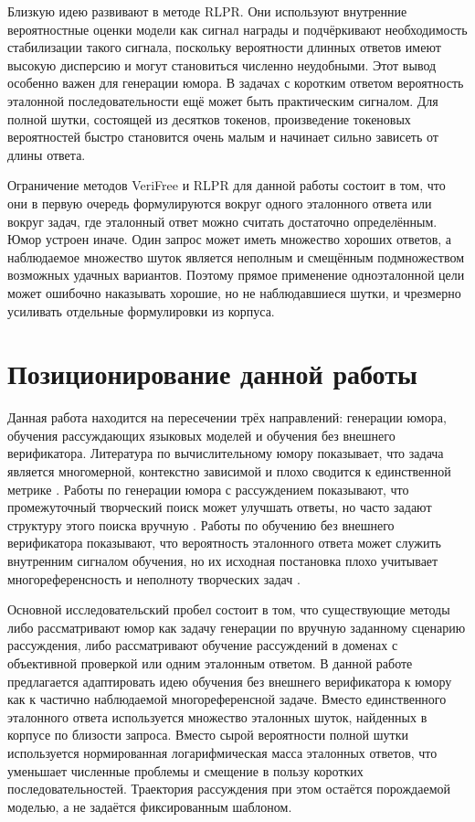 Близкую идею развивают \citet{Yu2025} в методе RLPR. Они используют внутренние вероятностные оценки модели как сигнал награды и подчёркивают необходимость стабилизации такого сигнала, поскольку вероятности длинных ответов имеют высокую дисперсию и могут становиться численно неудобными. Этот вывод особенно важен для генерации юмора. В задачах с коротким ответом вероятность эталонной последовательности ещё может быть практическим сигналом. Для полной шутки, состоящей из десятков токенов, произведение токеновых вероятностей быстро становится очень малым и начинает сильно зависеть от длины ответа.

Ограничение методов VeriFree и RLPR для данной работы состоит в том, что они в первую очередь формулируются вокруг одного эталонного ответа или вокруг задач, где эталонный ответ можно считать достаточно определённым. Юмор устроен иначе. Один запрос может иметь множество хороших ответов, а наблюдаемое множество шуток является неполным и смещённым подмножеством возможных удачных вариантов. Поэтому прямое применение одноэталонной цели может ошибочно наказывать хорошие, но не наблюдавшиеся шутки, и чрезмерно усиливать отдельные формулировки из корпуса.

\section{Позиционирование данной работы}

Данная работа находится на пересечении трёх направлений: генерации юмора, обучения рассуждающих языковых моделей и обучения без внешнего верификатора. Литература по вычислительному юмору показывает, что задача является многомерной, контекстно зависимой и плохо сводится к единственной метрике \citep{ritchie2001current,amin2020survey,Loakman2025,lemmens2026computational}. Работы по генерации юмора с рассуждением показывают, что промежуточный творческий поиск может улучшать ответы, но часто задают структуру этого поиска вручную \citep{chen2023prompt,zhong2024let,Tikhonov2024,Kim2025,ZhangJ2025}. Работы по обучению без внешнего верификатора показывают, что вероятность эталонного ответа может служить внутренним сигналом обучения, но их исходная постановка плохо учитывает многореференсность и неполноту творческих задач \citep{Zhou2025,Yu2025}.

Основной исследовательский пробел состоит в том, что существующие методы либо рассматривают юмор как задачу генерации по вручную заданному сценарию рассуждения, либо рассматривают обучение рассуждений в доменах с объективной проверкой или одним эталонным ответом. В данной работе предлагается адаптировать идею обучения без внешнего верификатора к юмору как к частично наблюдаемой многореференсной задаче. Вместо единственного эталонного ответа используется множество эталонных шуток, найденных в корпусе по близости запроса. Вместо сырой вероятности полной шутки используется нормированная логарифмическая масса эталонных ответов, что уменьшает численные проблемы и смещение в пользу коротких последовательностей. Траектория рассуждения при этом остаётся порождаемой моделью, а не задаётся фиксированным шаблоном.

